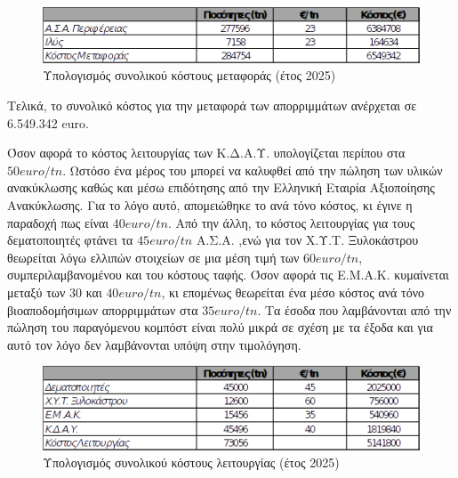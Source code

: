 \documentclass[12pt]{article}
\newcommand{\gr}{\selectlanguage{greek}}
\newcommand{\eng}{\selectlanguage{english}}
\begin{document}
	\begin{figure} [H]
		\begin{center}
			\includegraphics [scale = 0.95] {table22.png}
			\caption{Υπολογισμός συνολικού κόστους μεταφοράς (έτος 2025)}
		\end{center}
	\end{figure}

	Τελικά, το συνολικό κόστος για την μεταφορά των απορριμμάτων ανέρχεται σε 6.549.342 \eng euro.\gr
	
	Όσον αφορά το κόστος λειτουργίας των Κ.Δ.Α.Υ. υπολογίζεται περίπου στα $50 euro/tn$. Ωστόσο ένα μέρος του μπορεί να καλυφθεί από την πώληση των υλικών ανακύκλωσης καθώς και μέσω επιδότησης από την Ελληνική Εταιρία Αξιοποίησης Ανακύκλωσης. Για το λόγο αυτό, απομειώθηκε το ανά τόνο κόστος, κι έγινε η παραδοχή πως είναι $40 euro/tn$. Από την άλλη, το κόστος λειτουργίας για τους δεματοποιητές φτάνει τα $45 euro/tn$ Α.Σ.Α. ,ενώ για τον Χ.Υ.Τ. Ξυλοκάστρου θεωρείται λόγω ελλιπών στοιχείων σε μια μέση τιμή των $60 euro/tn$, συμπεριλαμβανομένου και του κόστους ταφής. Όσον αφορά τις Ε.Μ.Α.Κ. κυμαίνεται μεταξύ των $30$ και $40 euro/tn$, κι επομένως θεωρείται ένα μέσο κόστος ανά τόνο βιοαποδομήσιμων απορριμμάτων στα $35 euro/tn$. Τα έσοδα που λαμβάνονται από την πώληση του παραγόμενου κομπόστ είναι πολύ μικρά σε σχέση με τα έξοδα και για αυτό τον λόγο δεν λαμβάνονται υπόψη στην τιμολόγηση.
	
	\begin{figure} [H]
		\begin{center}
			\includegraphics [scale = 0.95] {table23.png}
			\caption{Υπολογισμός συνολικού κόστους λειτουργίας (έτος 2025)}
		\end{center}
	\end{figure}
\end{document}
